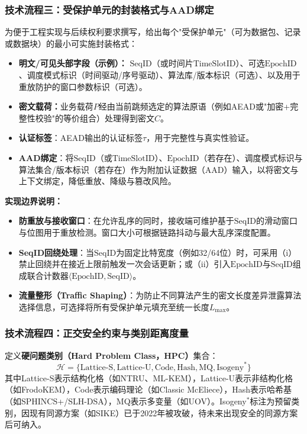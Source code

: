 ﻿\documentclass[12pt,a4paper]{article}
\begin{document}
\subsubsection*{技术流程三：受保护单元的封装格式与AAD绑定}

为便于工程实现与后续权利要求撰写，给出每个"受保护单元"（可为数据包、记录或数据块）的最小可实施封装格式：

\begin{itemize}
    \item \textbf{明文/可见头部字段（示例）：} $\text{SeqID}$（或时间片$\text{TimeSlotID}$）、可选$\text{EpochID}$、调度模式标识（时间驱动/序号驱动）、算法库/版本标识（可选）、以及用于重放防护的窗口参数标识（可选）。
    \item \textbf{密文载荷：}业务载荷$P$经由当前跳频选定的算法原语（例如AEAD或"加密+完整性校验"的等价组合）处理得到密文$C$。
    \item \textbf{认证标签}：AEAD输出的认证标签$\tau$，用于完整性与真实性验证。
    \item \textbf{AAD绑定}：将$\text{SeqID}$（或$\text{TimeSlotID}$）、$\text{EpochID}$（若存在）、调度模式标识与算法集合/版本标识（若存在）作为附加认证数据（AAD）输入，以将密文与上下文绑定，降低重放、降级与篡改风险。
\end{itemize}

\textbf{实现边界说明：}
\begin{itemize}
    \item \textbf{防重放与接收窗口}：在允许乱序的同时，接收端可维护基于$\text{SeqID}$的滑动窗口与位图用于重放检测。窗口大小可根据链路抖动与最大乱序深度配置。
    \item \textbf{SeqID回绕处理}：当$\text{SeqID}$为固定比特宽度（例如32/64位）时，可采用（i）禁止回绕并在接近上限前触发一次会话更新；或（ii）引入$\text{EpochID}$与$\text{SeqID}$组成联合计数器$\langle\text{EpochID},\text{SeqID}\rangle$。
    \item \textbf{流量整形（Traffic Shaping）}：为防止不同算法产生的密文长度差异泄露算法选择信息，可选择将所有受保护单元填充至统一长度$L_{\max}$。
\end{itemize}

\subsubsection*{技术流程四：正交安全约束与类别距离度量}

定义\textbf{硬问题类别（Hard Problem Class，HPC）}集合：
\[
\mathcal{H} = \{\text{Lattice-S}, \text{Lattice-U}, \text{Code}, \text{Hash}, \text{MQ}, \text{Isogeny}^*\}
\]
其中Lattice-S表示结构化格（如NTRU、ML-KEM），Lattice-U表示非结构化格（如FrodoKEM），Code表示编码理论（如Classic McEliece），Hash表示哈希基（如SPHINCS+/SLH-DSA），MQ表示多变量（如UOV）。Isogeny$^*$标注为预留类别，因现有同源方案（如SIKE）已于2022年被攻破，待未来出现安全的同源方案后可纳入。
\end{document}
